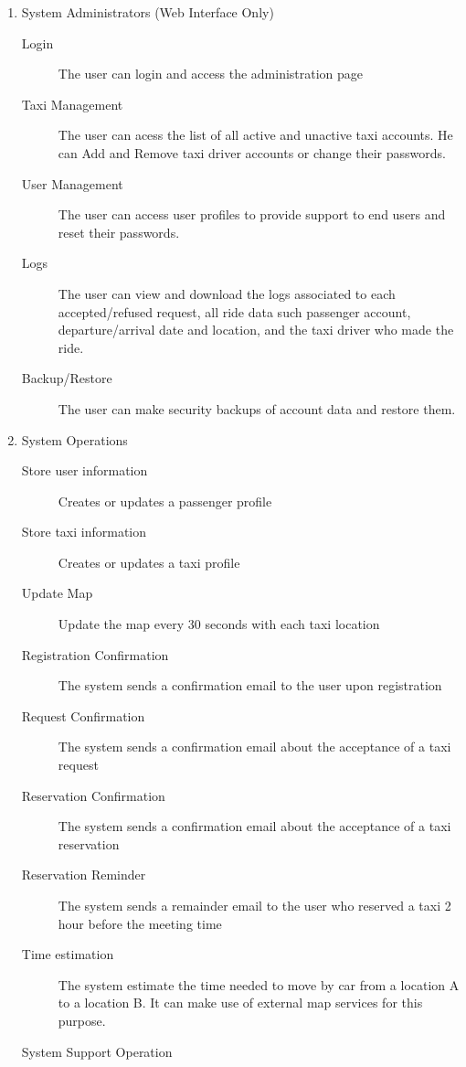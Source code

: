 \documentclass[11pt, a4paper,titlepage]{article}
\begin{document}
\begin{enumerate}
		\item System Administrators (Web Interface Only)  
			\begin{description}
				\item[Login] The user can login and access the administration page
				\item[Taxi Management] The user can acess the list of all active and unactive taxi accounts. He can Add and Remove taxi driver accounts or change their passwords.
				\item [User Management] The user can access user profiles to provide support to end users and reset their passwords.
				\item[Logs] The user can view and download the logs associated to each accepted/refused request, all ride data such passenger account, departure/arrival date and location, and the taxi driver who made the ride.
				\item[Backup/Restore] The user can make security backups of account data and restore them.
			\end{description}
		
		\item System Operations
		\begin{description}
			\item[Store user information] Creates or updates a passenger profile
			\item[Store taxi information] Creates or updates a taxi profile
			\item[Update Map] Update the map every 30 seconds with each taxi location
			\item[Registration Confirmation] The system sends a confirmation email to the user upon registration
			\item[Request Confirmation] The system sends a confirmation email about the acceptance of a taxi request
			\item[Reservation Confirmation]  The system sends a confirmation email about the acceptance of a taxi reservation
			\item[Reservation Reminder] The system sends a remainder email to the user who reserved a taxi 2 hour before the meeting time
			\item[Time estimation] The system estimate the time needed to move by car from a location A to a location B. It can make use of external map services for this purpose.
		\end{description}
		
		\item[System Support Operation]
			
	\end{enumerate}
\end{document}
